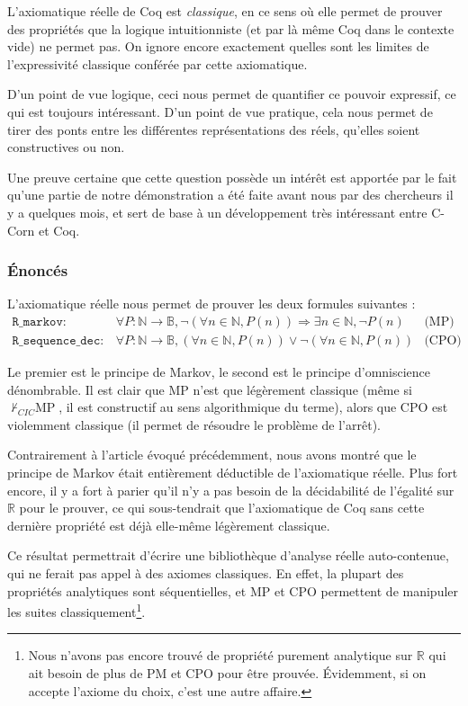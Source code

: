 \documentclass{article}
\begin{document}
L'axiomatique réelle de Coq est \emph{classique}, en ce sens où elle permet de prouver des propriétés que la logique intuitionniste (et par là même Coq dans le contexte vide) ne permet pas. On ignore encore exactement quelles sont les limites de l'expressivité classique conférée par cette axiomatique.

D'un point de vue logique, ceci nous permet de quantifier ce pouvoir expressif, ce qui est toujours intéressant. D'un point de vue pratique, cela nous permet de tirer des ponts entre les différentes représen\-tations des réels, qu'elles soient constructives ou non.

Une preuve certaine que cette question possède un intérêt est apportée par le fait qu'une partie de notre démonstration a été faite avant nous par des chercheurs il y a quelques mois, et sert de base à un développement très intéressant entre C-Corn et Coq.

\subsubsection{Énoncés}

L'axiomatique réelle nous permet de prouver les deux formules suivantes :
$$\begin{array}{llc}
\mathtt{R\_markov} :& \forall P : \mathbb{N}\rightarrow\mathbb{B}, \neg(\forall n\in\mathbb{N}, P(n)) \Rightarrow \exists n\in\mathbb{N}, \neg P(n) & \text{(MP)}\\
\mathtt{R\_sequence\_dec} :& \forall P : \mathbb{N}\rightarrow\mathbb{B}, (\forall n\in\mathbb{N}, P(n)) \vee \neg(\forall n\in\mathbb{N}, P(n)) & \text{(CPO)}
\end{array}$$

Le premier est le principe de Markov, le second est le principe d'omniscience dénombrable. Il est clair que MP n'est que légèrement classique (même si $\not\vdash_{CIC}\text{MP}$, il est constructif au sens algorithmique du terme), alors que CPO est violemment classique (il permet de résoudre le problème de l'arrêt).

Contrairement à l'article évoqué précédemment, nous avons montré que le principe de Markov était entièrement déductible de l'axiomatique réelle. Plus fort encore, il y a fort à parier qu'il n'y a pas besoin de la décidabilité de l'égalité sur $\mathbb{R}$ pour le prouver, ce qui sous-tendrait que l'axiomatique de Coq sans cette dernière propriété est déjà elle-même légèrement classique.

Ce résultat permettrait d'écrire une bibliothèque d'analyse réelle auto-contenue, qui ne ferait pas appel à des axiomes classiques. En effet, la plupart des propriétés analytiques sont séquentielles, et MP et CPO permettent de manipuler les suites classiquement\footnote{Nous n'avons pas encore trouvé de propriété purement analytique sur $\mathbb{R}$ qui ait besoin de plus de PM et CPO pour être prouvée. Évidemment, si on accepte l'axiome du choix, c'est une autre affaire.}.
\end{document}
